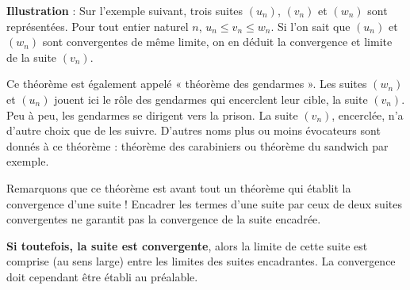 \documentclass[11pt,fleqn, openany]{book} %
\begin{document}
\textbf{Illustration} : Sur l'exemple suivant, trois suites $(u_n)$, $(v_n)$ et $(w_n)$ sont représentées. Pour tout entier naturel $n$, $u_n \leqslant v_n \leqslant w_n$. Si l'on sait que $(u_n)$ et $(w_n)$ sont convergentes de même limite, on en déduit la convergence et limite de la suite $(v_n)$.

\begin{center}
\end{center}

Ce théorème est également appelé « théorème des gendarmes ». Les suites $(w_n)$ et $(u_n)$ jouent ici le rôle des gendarmes qui encerclent leur cible, la suite $(v_n)$. Peu à peu, les gendarmes se dirigent vers la prison. La suite $(v_n)$, encerclée, n'a d'autre choix que de les suivre. D'autres noms plus ou moins évocateurs sont donnés à ce théorème : théorème des carabiniers ou théorème du sandwich par exemple.

Remarquons que ce théorème est avant tout un théorème qui établit la convergence d'une suite ! Encadrer les termes d'une suite par ceux de deux suites convergentes ne garantit pas la convergence de la suite encadrée. 

\textbf{Si toutefois, la suite est convergente}, alors la limite de cette suite est comprise (au sens large) entre les limites des suites encadrantes. La convergence doit cependant être établi au préalable.
\end{document}
